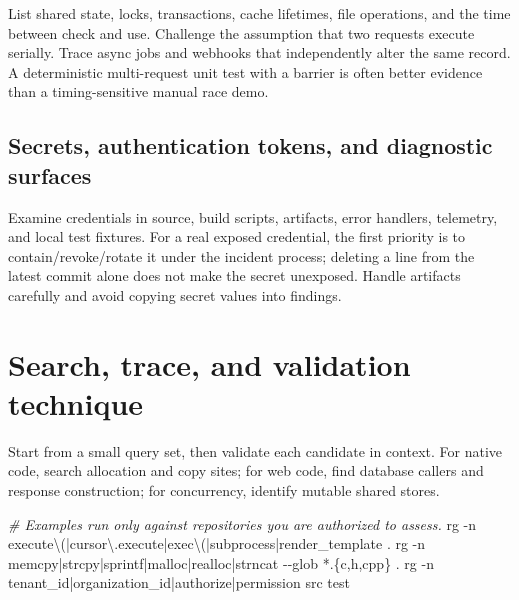 \documentclass[
  letterpaper,
]{article}
\newenvironment{Shaded}{}{}
\newcommand{\AttributeTok}[1]{\textcolor[rgb]{0.49,0.56,0.16}{#1}}
\newcommand{\CommentTok}[1]{\textcolor[rgb]{0.38,0.63,0.69}{\textit{#1}}}
\newcommand{\ExtensionTok}[1]{#1}
\newcommand{\NormalTok}[1]{#1}
\newcommand{\StringTok}[1]{\textcolor[rgb]{0.25,0.44,0.63}{#1}}
\begin{document}
List shared state, locks, transactions, cache lifetimes, file
operations, and the time between check and use. Challenge the assumption
that two requests execute serially. Trace async jobs and webhooks that
independently alter the same record. A deterministic multi-request unit
test with a barrier is often better evidence than a timing-sensitive
manual race demo.

\subsection{Secrets, authentication tokens, and diagnostic
surfaces}\label{secrets-authentication-tokens-and-diagnostic-surfaces}

Examine credentials in source, build scripts, artifacts, error handlers,
telemetry, and local test fixtures. For a real exposed credential, the
first priority is to contain/revoke/rotate it under the incident
process; deleting a line from the latest commit alone does not make the
secret unexposed. Handle artifacts carefully and avoid copying secret
values into findings.

\section{Search, trace, and validation
technique}\label{search-trace-and-validation-technique}

Start from a small query set, then validate each candidate in context.
For native code, search allocation and copy sites; for web code, find
database callers and response construction; for concurrency, identify
mutable shared stores.

\begin{Shaded}
\begin{Highlighting}[]
\CommentTok{\# Examples run only against repositories you are authorized to assess.}
\ExtensionTok{rg} \AttributeTok{{-}n} \StringTok{\textquotesingle{}execute\textbackslash{}(|cursor\textbackslash{}.execute|exec\textbackslash{}(|subprocess|render\_template\textquotesingle{}}\NormalTok{ .}
\ExtensionTok{rg} \AttributeTok{{-}n} \StringTok{\textquotesingle{}memcpy|strcpy|sprintf|malloc|realloc|strncat\textquotesingle{}} \AttributeTok{{-}{-}glob} \StringTok{\textquotesingle{}*.\{c,h,cpp\}\textquotesingle{}}\NormalTok{ .}
\ExtensionTok{rg} \AttributeTok{{-}n} \StringTok{\textquotesingle{}tenant\_id|organization\_id|authorize|permission\textquotesingle{}}\NormalTok{ src test}
\end{Highlighting}
\end{Shaded}
\end{document}
